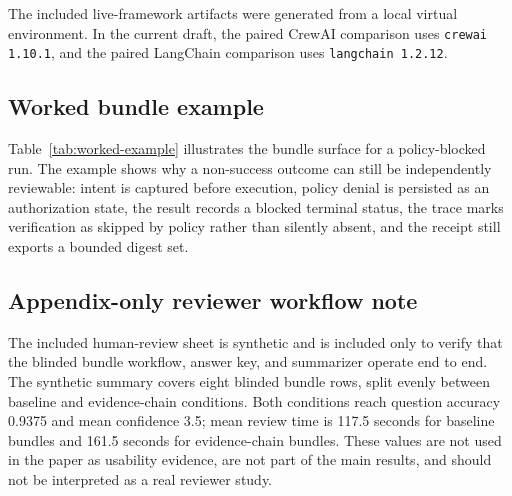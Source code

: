 The included live-framework artifacts were generated from a local virtual environment. In the current draft, the paired CrewAI comparison uses \texttt{crewai 1.10.1}, and the paired LangChain comparison uses \texttt{langchain 1.2.12}.

\subsection{Worked bundle example}
\label{sec:appendix-worked-example}

Table~\ref{tab:worked-example} illustrates the bundle surface for a policy-blocked run. The example shows why a non-success outcome can still be independently reviewable: intent is captured before execution, policy denial is persisted as an authorization state, the result records a blocked terminal status, the trace marks verification as skipped by policy rather than silently absent, and the receipt still exports a bounded digest set.

\subsection{Appendix-only reviewer workflow note}
\label{sec:appendix-human-review}

The included human-review sheet is synthetic and is included only to verify that the blinded bundle workflow, answer key, and summarizer operate end to end. The synthetic summary covers eight blinded bundle rows, split evenly between baseline and evidence-chain conditions. Both conditions reach question accuracy 0.9375 and mean confidence 3.5; mean review time is 117.5 seconds for baseline bundles and 161.5 seconds for evidence-chain bundles. These values are not used in the paper as usability evidence, are not part of the main results, and should not be interpreted as a real reviewer study.
